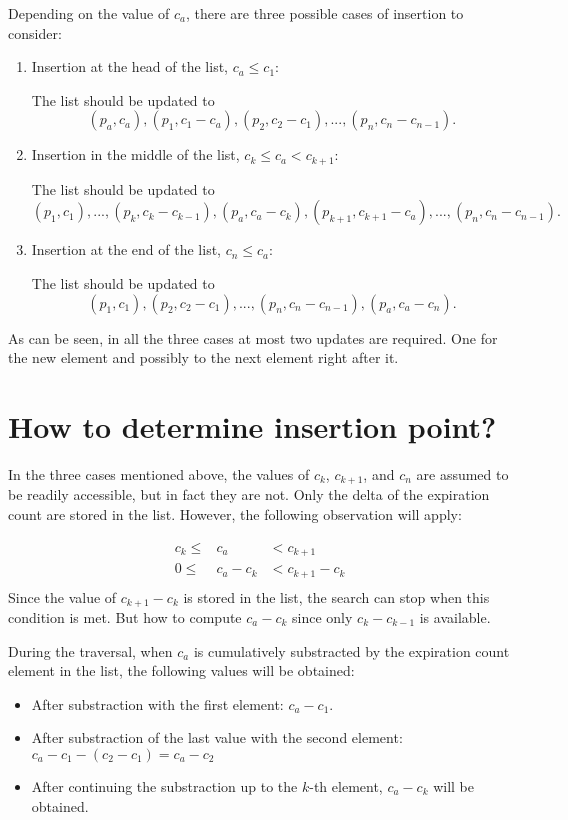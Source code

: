 \documentclass[12pt]{article}
\begin{document}
Depending on the value of $c_a$,
there are three possible cases of insertion to consider:
\begin{enumerate}
\item Insertion at the head of the list, $c_a \le c_1$:

The list should be updated to
$$
(p_a, c_a),
(p_1, c_1 - c_a),
(p_2, c_2 - c_1),
...,
(p_n, c_n - c_{n-1}).
$$
\item Insertion in the middle of the list, $c_k \le c_a < c_{k+1}$:

The list should be updated to
$$
(p_1, c_1),
...,
(p_k, c_k - c_{k-1}),
(p_a, c_a - c_k),
(p_{k+1}, c_{k+1} - c_a),
...,
(p_n, c_n - c_{n-1}).
$$
\item Insertion at the end of the list, $c_n \le c_a$:

The list should be updated to
$$
(p_1, c_1),
(p_2, c_2 - c_1),
...,
(p_n, c_n - c_{n-1}),
(p_a, c_a - c_n).
$$
\end{enumerate}
As can be seen, in all the three cases at most two updates are required.
One for the new element and possibly to the next element right after it.

\section*{How to determine insertion point?}
In the three cases mentioned above, the values of $c_k$, $c_{k+1}$, and
$c_n$ are assumed to be readily accessible, but in fact they are not.
Only the delta of the expiration count are stored in the list.
However, the following observation will apply:

\begin{eqnarray*}
c_k \le& c_a       & < c_{k+1}\\
  0 \le& c_a - c_k & < c_{k+1} - c_k\\
\end{eqnarray*}
Since the value of $c_{k+1} - c_k$ is stored in the list, the search can
stop when this condition is met. But how to compute $c_a - c_k$ since
only $c_k - c_{k-1}$ is available.

During the traversal, when $c_a$ is cumulatively substracted by the
expiration count element in the list, the following values will be
obtained: 
\begin{itemize}
\item After substraction with the first element: $c_a - c_1$.
\item After substraction of the last value with the second element:
$c_a - c_1 - (c_2 - c_1) = c_a - c_2$
\item After continuing the substraction up to the $k$-th element, 
$c_a - c_k$ will be obtained.
\end{itemize}
\end{document}
